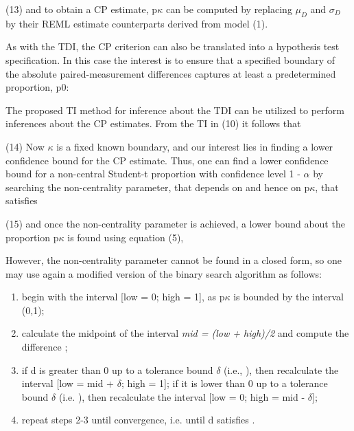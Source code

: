 \documentclass[MAIN.tex]{subfiles}
\begin{document}
	(13)
	and to obtain a CP estimate, p$\kappa$ can be computed by replacing $\mu_D$ and $\sigma_D$ by their REML estimate counterparts derived from model (1).
	
	As with the TDI, the CP criterion can also be translated into a hypothesis test specification. 
	In this case the interest is to ensure that a specified boundary of the absolute paired-measurement differences captures at least a predetermined proportion, p0:
	
	
	The proposed TI method for inference about the TDI can be utilized to perform inferences about the CP estimates. From the TI in (10) it follows that
	
	(14)
	Now $\kappa$ is a fixed known boundary, and our interest lies in finding a lower confidence bound for the CP estimate. 
	Thus, one can find a lower confidence bound for a non-central Student-t proportion with confidence level 1 - $\alpha$ by searching the non-centrality parameter, 
	that depends on  and hence on p$\kappa$, that satisfies
	
	(15)
	and once the non-centrality parameter  is achieved, a lower bound about the proportion p$\kappa$ is found using equation (5), 
	
	
	However, the non-centrality parameter cannot be found in a closed form, so one may use again a modified version of the binary search algorithm as follows:
	
	\begin{enumerate}
		\item begin with the interval [low = 0; high = 1], as p$\kappa$ is bounded by the interval (0,1);
		
		\item calculate the midpoint of the interval \textit{mid = (low + high)/2} and compute the difference ;
		
		\item if d is greater than 0 up to a tolerance bound $\delta$ (i.e., ), then recalculate the interval [low = mid + $\delta$; high = 1]; if it is 
		lower than 0 up to a tolerance bound $\delta$ (i.e. ), then recalculate the interval [low = 0; high = mid - $\delta$];
		
		\item repeat steps 2-3 until convergence, i.e. until d satisfies .
	\end{enumerate}
	
	
	
	
	
\end{document}
